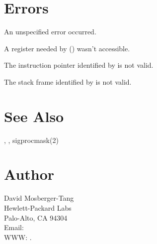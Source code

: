 \documentclass{article}
\begin{document}
\section{Errors}

\begin{Description}
\item[\Const{UNW\_EUNSPEC}] An unspecified error occurred.
\item[\Const{UNW\_EBADREG}] A register needed by () wasn't
  accessible.
\item[\Const{UNW\_EINVALIDIP}] The instruction pointer identified by
   is not valid.
\item[\Const{UNW\_BADFRAME}] The stack frame identified by
   is not valid.
\end{Description}

\section{See Also}

,
,
sigprocmask(2)

\section{Author}

\noindent
David Mosberger-Tang\\
Hewlett-Packard Labs\\
Palo-Alto, CA 94304\\
Email: \\
WWW: .
\LatexManEnd
\end{document}
